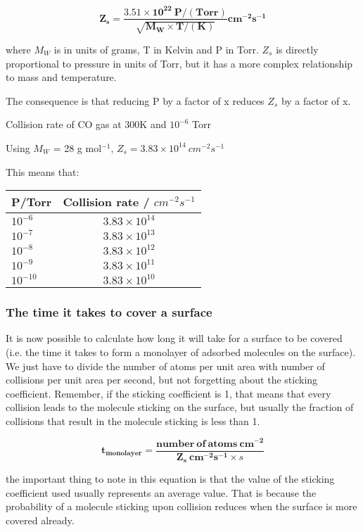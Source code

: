 \documentclass[ignorenonframetext]{beamer}
\begin{document}
\[\mathbf{Z_s = \frac{3.51\times10^{22}\ P/(Torr)}{\sqrt{M_W\times T/(K)}}cm^{-2}s^{-1}}\]

\medskip where \(M_W\) is in units of grams, T in Kelvin and P in Torr. \(Z_s\) is directly proportional to pressure in units of Torr, but it has a more complex relationship to mass and temperature.

The consequence is that reducing P by a factor of x reduces \(Z_s\) by a factor of x.

\begin{example}{Collision rate of CO gas at 300K and \(10^{-6}\) Torr}

Using \(M_W\) = 28 g mol\(^{-1}\), \(Z_s = 3.83\times10^{14}\ cm^{-2}s^{-1}\)

\medskip This means that:

\begin{tabular}{l|c}
P/Torr & Collision rate / \(cm^{-2}s^{-1}\)\\\hline
\(10^{-6}\) & \(3.83\times10^{14}\)\\
\(10^{-7}\) & \(3.83\times10^{13}\)\\
\(10^{-8}\) & \(3.83\times10^{12}\)\\
\(10^{-9}\) & \(3.83\times10^{11}\)\\
\(10^{-10}\) & \(3.83\times10^{10}\)\\\hline
\end{tabular}

\end{example}

\subsubsection{The time it takes to cover a surface}

It is now possible to calculate how long it will take for a surface to be covered (i.e. the time it takes to form a monolayer of adsorbed molecules on the surface). We just have to divide the number of atoms per unit area with number of collisions per unit area per second, but not forgetting about the sticking coefficient. Remember, if the sticking coefficient is 1, that means that every collision leads to the molecule sticking on the surface, but usually the fraction of collisions that result in the molecule sticking is less than 1.

\[\mathbf{t_{monolayer} = \frac{number\ of\ atoms\ cm^{-2}}{Z_s\ cm^{-2}s^{-1} \times \mathit{s}}}\]

\medskip the important thing to note in this equation is that the value of the sticking coefficient used usually represents an average value. That is because the probability of a molecule sticking upon collision reduces when the surface is more covered already.
\end{document}
